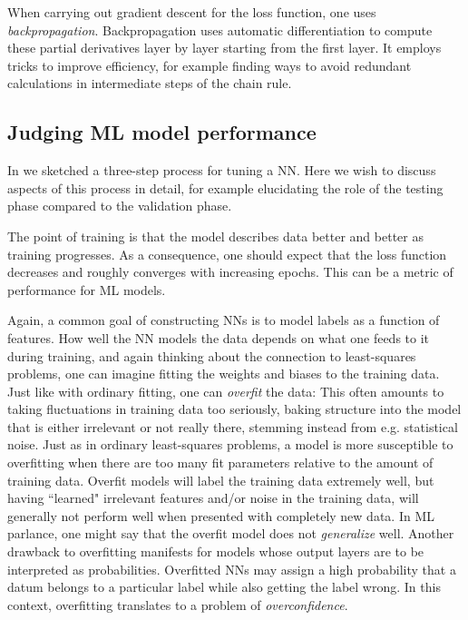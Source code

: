 When carrying out gradient descent for the loss function, one uses {\it
backpropagation}. Backpropagation uses automatic
differentiation to compute these partial derivatives layer by layer starting
from the first layer. It employs tricks to improve efficiency, for example
finding ways to avoid redundant calculations in intermediate steps of the chain
rule.

\subsection{Judging ML model performance}

In  we sketched a three-step process for tuning a NN.
Here we wish to discuss aspects of this process in detail, for example
elucidating the role of the testing phase compared to the validation phase.

The point of training is that the model describes data better and better as
training progresses. As a consequence, one should expect that the loss function
decreases and roughly converges with increasing epochs. This can be a metric of
performance for ML models.

Again, a common goal of constructing NNs is to model labels as a function of
features. How well the NN models the data depends on what one feeds to it during
training, and again thinking about the connection to least-squares problems,
one can imagine fitting the weights and biases to the training data. Just like
with ordinary fitting, one can {\it overfit} the data: This
often amounts to taking fluctuations in training data too seriously, baking structure
into the model that is either irrelevant or not really there, stemming instead
from e.g. statistical noise. Just as in ordinary least-squares problems,
a model is more susceptible to overfitting when there are too many fit
parameters relative to the amount of training data. 
Overfit models will label the training data
extremely well, but having ``learned" irrelevant features and/or noise in the
training data, will generally not perform well when presented with completely
new data. In ML parlance, one might say that the overfit model does not
{\it generalize} well. Another drawback to overfitting
manifests for models whose output layers are to be interpreted as probabilities.
Overfitted NNs may assign a high probability that a datum belongs to a particular
label while also getting the label wrong. In this context, overfitting
translates to a problem of {\it overconfidence}.

